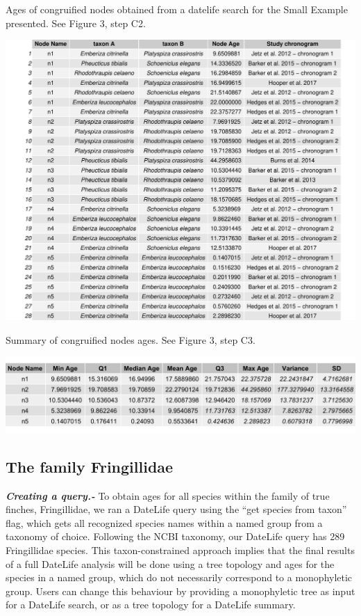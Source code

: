 \documentclass[
  man]{apa6}
\begin{document}
\label{fig:figure2}

\vspace{15mm}

\begin{table}[H]
  \caption{Ages of congruified nodes obtained from a datelife search for the Small Example presented. See Figure 3, step C2.}
  \label{tbl:table1}
  \includegraphics[width=\linewidth]{../tables/table-fringillidae-small-example.pdf}
\end{table}

\begin{table}[H]
  \caption{Summary of congruified nodes ages. See Figure 3, step C3.}
  \label{tbl:table2}
  \includegraphics[width=\linewidth]{../tables/table-fringillidae-small-example-summary.png}
\end{table}

\hypertarget{the-family-fringillidae}{%
\subsection{The family Fringillidae}\label{the-family-fringillidae}}

\emph{\textbf{Creating a query.-}}
To obtain ages for all species within the family of true finches, Fringillidae, we ran a DateLife query using the ``get species from taxon'' flag,
which gets all recognized species names within a named group from a taxonomy of choice.
Following the NCBI taxonomy, our DateLife query has 289 Fringillidae species.
This taxon-constrained approach implies that the final results of a full DateLife analysis will be done using a tree topology and ages for the species in a named group, which do not necessarily correspond to a monophyletic group. Users can change this behaviour by providing a monophyletic tree as input for a DateLife search, or as a tree topology for a DateLife summary.
\end{document}
